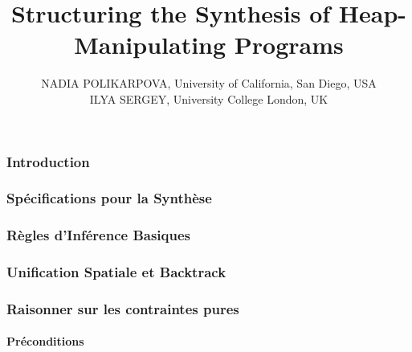 \documentclass{beamer}
\title{Structuring the Synthesis of Heap-Manipulating Programs}
\author{NADIA POLIKARPOVA, University of California, San Diego, USA \\
ILYA SERGEY, University College London, UK}
\date{}
\begin{document}
	\maketitle
\begin{frame}[fragile]
	\frametitle{Introduction}
\end{frame}
\begin{frame}[fragile]
	\frametitle{Sp\'ecifications pour la Synth\`ese}
\end{frame}
\begin{frame}[fragile]
	\frametitle{R\`egles d'Inf\'erence Basiques}
\end{frame}
\begin{frame}[fragile]
	\frametitle{Unification Spatiale et Backtrack}
\end{frame}
\begin{frame}[fragile]
	\frametitle{Raisonner sur les contraintes pures}
	\framesubtitle{Pr\'econditions}
\end{frame}
\end{document}
